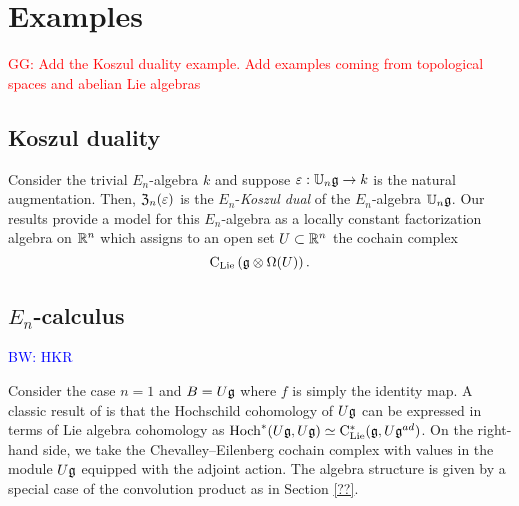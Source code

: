 \documentclass[11pt]{amsart}
\numberwithin{equation}{section}
\def\brian{\textcolor{blue}{BW: }\textcolor{blue}}
\def\greg{\textcolor{red}{GG: }\textcolor{red}}
\begin{document}
%
%

\section{Examples}


\greg{Add the Koszul duality example. Add examples coming from topological spaces and abelian Lie algebras}

\subsection{Koszul duality}
\label{sec: Koszul}

Consider the trivial $E_n$-algebra $k$ and suppose $\varepsilon : \mathbb U_n \mathfrak g \to k$ is the natural augmentation. 
Then, ${\frak Z}_n (\varepsilon)$ is the $E_n$-{\em Koszul dual} of the $E_n$-algebra $\mathbb U_n \mathfrak g$. 
Our results provide a model for this $E_n$-algebra as a locally constant factorization algebra on $\mathbb R^n$ which assigns to an open set $U \subset \mathbb R^n$ the cochain complex
\[
{\rm C}_{{\rm Lie}} \left(\mathfrak g \otimes \Omega(U) \right) .
\]

\subsection{$E_n$-calculus}
\label{sec: TT}

\brian{HKR}

Consider the case $n=1$ and $B = U \mathfrak g$ where $f$ is simply the identity map. 
A classic result of \cite{HochSerre} is that the Hochschild cohomology of $U \mathfrak g$ can be expressed in terms of Lie algebra cohomology as ${\rm Hoch}^*(U\mathfrak g,U\mathfrak g) \simeq {\rm C}_{\rm Lie}^*(\mathfrak g, U\mathfrak g^{ad})$. 
On the right-hand side, we take the Chevalley--Eilenberg cochain complex with values in the module $U \mathfrak g$ equipped with the adjoint action.
The algebra structure is given by a special case of the convolution product as in Section \ref{??}. 
\end{document}
